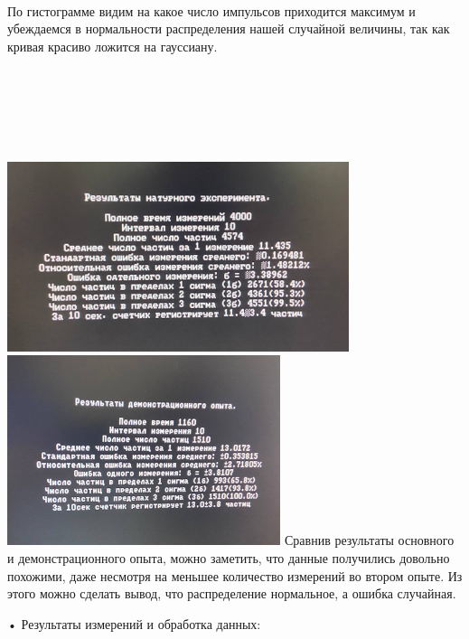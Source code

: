 \\
По гистограмме видим на какое число импульсов приходится максимум и убеждаемся в нормальности распределения нашей случайной величины, так как кривая красиво ложится на гауссиану.
\newline
\bigskip
\\
\\
\\
\\
\\
\\
\\
\includegraphics[width=10cm ]{5}
\includegraphics[width=8cm ]{6}
Сравнив результаты основного и демонстрационного опыта, можно заметить, что данные получились довольно похожими, даже несмотря на меньшее количество измерений во втором опыте. Из этого можно сделать вывод, что распределение нормальное, а ошибка случайная.
\newpage
 
	• Результаты измерений и обработка данных:
	

